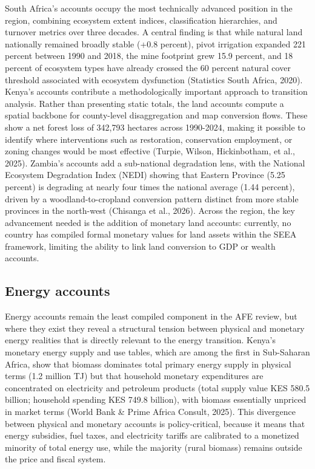 \documentclass[
  letterpaper,
  DIV=11,
  numbers=noendperiod]{scrartcl}
\begin{document}
South Africa's accounts occupy the most technically advanced position in
the region, combining ecosystem extent indices, classification
hierarchies, and turnover metrics over three decades. A central finding
is that while natural land nationally remained broadly stable (+0.8
percent), pivot irrigation expanded 221 percent between 1990 and 2018,
the mine footprint grew 15.9 percent, and 18 percent of ecosystem types
have already crossed the 60 percent natural cover threshold associated
with ecosystem dysfunction (Statistics South Africa, 2020). Kenya's
accounts contribute a methodologically important approach to transition
analysis. Rather than presenting static totals, the land accounts
compute a spatial backbone for county-level disaggregation and map
conversion flows. These show a net forest loss of 342,793 hectares
across 1990-2024, making it possible to identify where interventions
such as restoration, conservation employment, or zoning changes would be
most effective (Turpie, Wilson, Hickinbotham, et al., 2025). Zambia's
accounts add a sub-national degradation lens, with the National
Ecosystem Degradation Index (NEDI) showing that Eastern Province (5.25
percent) is degrading at nearly four times the national average (1.44
percent), driven by a woodland-to-cropland conversion pattern distinct
from more stable provinces in the north-west (Chisanga et al., 2026).
Across the region, the key advancement needed is the addition of
monetary land accounts: currently, no country has compiled formal
monetary values for land assets within the SEEA framework, limiting the
ability to link land conversion to GDP or wealth accounts.

\subsection{Energy accounts}\label{energy-accounts}

Energy accounts remain the least compiled component in the AFE review,
but where they exist they reveal a structural tension between physical
and monetary energy realities that is directly relevant to the energy
transition. Kenya's monetary energy supply and use tables, which are
among the first in Sub-Saharan Africa, show that biomass dominates total
primary energy supply in physical terms (1.2 million TJ) but that
household monetary expenditures are concentrated on electricity and
petroleum products (total supply value KES 580.5 billion; household
spending KES 749.8 billion), with biomass essentially unpriced in market
terms (World Bank \& Prime Africa Consult, 2025). This divergence
between physical and monetary accounts is policy-critical, because it
means that energy subsidies, fuel taxes, and electricity tariffs are
calibrated to a monetized minority of total energy use, while the
majority (rural biomass) remains outside the price and fiscal system.
\end{document}
